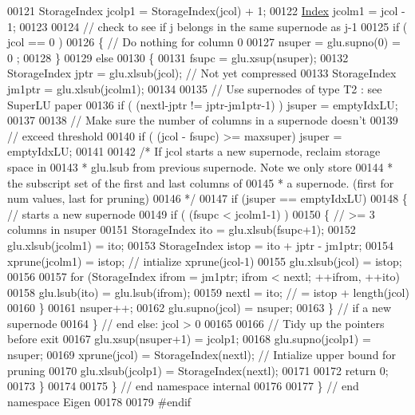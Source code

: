 \begin{DoxyCode}
00121   StorageIndex jcolp1 = StorageIndex(jcol) + 1;
00122   \hyperlink{namespace_eigen_a62e77e0933482dafde8fe197d9a2cfde}{Index} jcolm1 = jcol - 1;
00123   
00124   \textcolor{comment}{// check to see if j belongs in the same supernode as j-1}
00125   \textcolor{keywordflow}{if} ( jcol == 0 )
00126   \{ \textcolor{comment}{// Do nothing for column 0 }
00127     nsuper = glu.supno(0) = 0 ;
00128   \}
00129   \textcolor{keywordflow}{else} 
00130   \{
00131     fsupc = glu.xsup(nsuper); 
00132     StorageIndex jptr = glu.xlsub(jcol); \textcolor{comment}{// Not yet compressed}
00133     StorageIndex jm1ptr = glu.xlsub(jcolm1); 
00134     
00135     \textcolor{comment}{// Use supernodes of type T2 : see SuperLU paper}
00136     \textcolor{keywordflow}{if} ( (nextl-jptr != jptr-jm1ptr-1) ) jsuper = emptyIdxLU;
00137     
00138     \textcolor{comment}{// Make sure the number of columns in a supernode doesn't}
00139     \textcolor{comment}{// exceed threshold}
00140     \textcolor{keywordflow}{if} ( (jcol - fsupc) >= maxsuper) jsuper = emptyIdxLU; 
00141     
00142     \textcolor{comment}{/* If jcol starts a new supernode, reclaim storage space in}
00143 \textcolor{comment}{     * glu.lsub from previous supernode. Note we only store }
00144 \textcolor{comment}{     * the subscript set of the first and last columns of }
00145 \textcolor{comment}{     * a supernode. (first for num values, last for pruning)}
00146 \textcolor{comment}{     */}
00147     \textcolor{keywordflow}{if} (jsuper == emptyIdxLU)
00148     \{ \textcolor{comment}{// starts a new supernode }
00149       \textcolor{keywordflow}{if} ( (fsupc < jcolm1-1) ) 
00150       \{ \textcolor{comment}{// >= 3 columns in nsuper}
00151         StorageIndex ito = glu.xlsub(fsupc+1);
00152         glu.xlsub(jcolm1) = ito; 
00153         StorageIndex istop = ito + jptr - jm1ptr; 
00154         xprune(jcolm1) = istop; \textcolor{comment}{// intialize xprune(jcol-1)}
00155         glu.xlsub(jcol) = istop; 
00156         
00157         \textcolor{keywordflow}{for} (StorageIndex ifrom = jm1ptr; ifrom < nextl; ++ifrom, ++ito)
00158           glu.lsub(ito) = glu.lsub(ifrom); 
00159         nextl = ito;  \textcolor{comment}{// = istop + length(jcol)}
00160       \}
00161       nsuper++; 
00162       glu.supno(jcol) = nsuper; 
00163     \} \textcolor{comment}{// if a new supernode }
00164   \} \textcolor{comment}{// end else:  jcol > 0}
00165   
00166   \textcolor{comment}{// Tidy up the pointers before exit}
00167   glu.xsup(nsuper+1) = jcolp1; 
00168   glu.supno(jcolp1) = nsuper; 
00169   xprune(jcol) = StorageIndex(nextl);  \textcolor{comment}{// Intialize upper bound for pruning}
00170   glu.xlsub(jcolp1) = StorageIndex(nextl); 
00171   
00172   \textcolor{keywordflow}{return} 0; 
00173 \}
00174 
00175 \} \textcolor{comment}{// end namespace internal}
00176 
00177 \} \textcolor{comment}{// end namespace Eigen}
00178 
00179 \textcolor{preprocessor}{#endif}
\end{DoxyCode}
